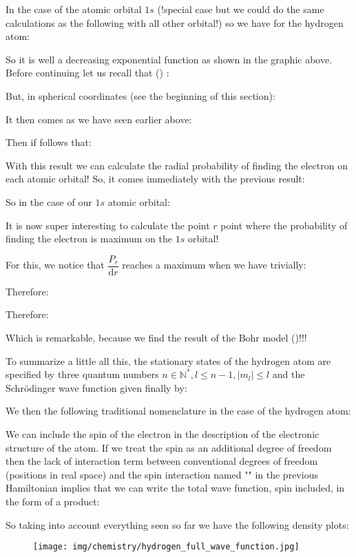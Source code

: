	In the case of the atomic orbital $1s$ (!special case but we could do the same calculations as the following with all other orbital!) so we have for the hydrogen atom:
	
	So it is well a decreasing exponential function as shown in the graphic above. Before continuing let us recall that () :
	
	But, in spherical coordinates (see the beginning of this section):
	
	It then comes as we have seen earlier above:
	
	Then if follows that:
	
	With this result we can calculate the radial probability of finding the electron on each atomic orbital! So, it comes immediately with the previous result:
	
	So in the case of our $1s$ atomic orbital:
	
	It is now super interesting to calculate the point $r$ point where the probability of finding the electron is maximum on the $1s$ orbital!

	For this, we notice that $\dfrac{P_r}{\mathrm{d}r}$ reaches a maximum when we have trivially:
	
	Therefore:
	
	Therefore:
	
	Which is remarkable, because we find the result of the Bohr model ()!!!

	To summarize a little all this, the stationary states of the hydrogen atom are specified by three quantum numbers $n\in\mathbb{N}^{*},l\leq n-1,|m_l|\leq l$ and the Schrödinger wave function given finally by:
	
	We then the following traditional nomenclature in the case of the hydrogen atom:
	
	We can include the spin of the electron in the description of the electronic structure of the atom. If we treat the spin as an additional degree of freedom then the lack of interaction term between conventional degrees of freedom (positions in real space) and the spin interaction named "" in the previous Hamiltonian implies that we can write the total wave function, spin included, in the form of a product:
	
	
	So taking into account everything seen so far we have the following density plots:
	\begin{figure}[H]
		\centering
		\texttt{[image: img/chemistry/hydrogen\_full\_wave\_function.jpg]}	
	\end{figure}
	
